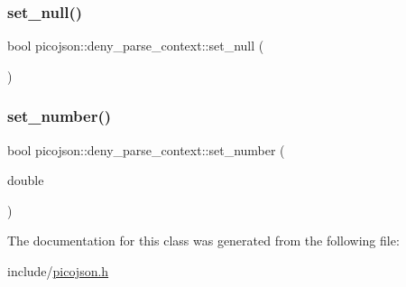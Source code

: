 \subsubsection{\texorpdfstring{set\+\_\+null()}{set\_null()}}
{\footnotesize\ttfamily bool picojson\+::deny\+\_\+parse\+\_\+context\+::set\+\_\+null (\begin{DoxyParamCaption}{ }\end{DoxyParamCaption})\hspace{0.3cm}{\ttfamily [inline]}}

\hypertarget{classpicojson_1_1deny__parse__context_aec324fbb7fea546b6e0673724873e1e1}{}\label{classpicojson_1_1deny__parse__context_aec324fbb7fea546b6e0673724873e1e1} 
\subsubsection{\texorpdfstring{set\+\_\+number()}{set\_number()}}
{\footnotesize\ttfamily bool picojson\+::deny\+\_\+parse\+\_\+context\+::set\+\_\+number (\begin{DoxyParamCaption}\item[{double}]{ }\end{DoxyParamCaption})\hspace{0.3cm}{\ttfamily [inline]}}



The documentation for this class was generated from the following file\+:\begin{DoxyCompactItemize}
\item 
include/\hyperlink{picojson_8h}{picojson.\+h}\end{DoxyCompactItemize}
